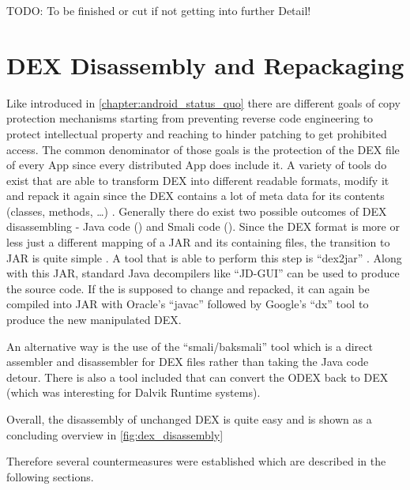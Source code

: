 TODO: To be finished or cut if not getting into further Detail!



\section{DEX Disassembly and Repackaging}
Like introduced in \autoref{chapter:android_status_quo} there
are different goals of copy protection mechanisms starting from
preventing reverse code engineering to protect intellectual property
and reaching to hinder patching to get prohibited access.
The common denominator of those goals is the protection of
the DEX file of every App since every distributed App does include
it. A variety of tools do exist that
are able to transform DEX into different readable formats,
modify it and repack it again since the DEX contains
a lot of meta data for its contents (classes, methods, \ldots)
\parencite{dex}.
Generally there do exist two possible outcomes of DEX disassembling
- Java code () and Smali code ().
Since the DEX format is more or less just a different mapping of a
JAR and its containing  files, the transition to JAR
is quite simple \parencite{dvminternals}. A tool that is able to
perform this step is ``dex2jar'' \parencite{dex2jartool}.
Along with this JAR, standard Java decompilers like ``JD-GUI''
\parencite{jdtool} can be used to produce the  source code.
If the  is supposed to change and repacked, it can
again be compiled into JAR with Oracle's ``javac'' \parencite{javactool}
followed by Google's ``dx'' tool \parencite{dxtool}
to produce the new manipulated DEX.

An alternative way is the use of the ``smali/baksmali'' tool
\parencite{smalitool} which is a direct assembler and disassembler
for DEX files rather than taking the Java code detour. There is also
a tool included that can convert the ODEX back to DEX (which was interesting
for Dalvik Runtime systems).

Overall, the disassembly of unchanged DEX is quite easy and is shown
as a concluding overview in \autoref{fig:dex_disassembly}

Therefore several countermeasures were established which are
described in the following sections.

